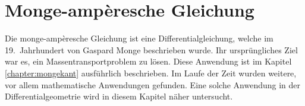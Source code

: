 %
%
%
%
\chapter{Monge-ampèresche Gleichung\label{chapter:mongeampere}}
\begin{refsection}
%
%

\noindent
Die monge-ampèresche Gleichung ist eine Differentialgleichung, welche
%
im 19.~Jahrhundert von Gaspard Monge beschrieben wurde. 
%
Ihr ursprüngliches Ziel war es, ein Massentransportproblem zu lösen. 
Diese Anwendung ist im Kapitel \ref{chapter:mongekant} ausführlich beschrieben.
Im Laufe der Zeit wurden weitere, vor allem mathematische Anwendungen
gefunden.
Eine solche Anwendung in der Differentialgeometrie wird in diesem Kapitel näher 
%
untersucht.




% 

\printbibliography[heading=subbibliography]
\end{refsection}
